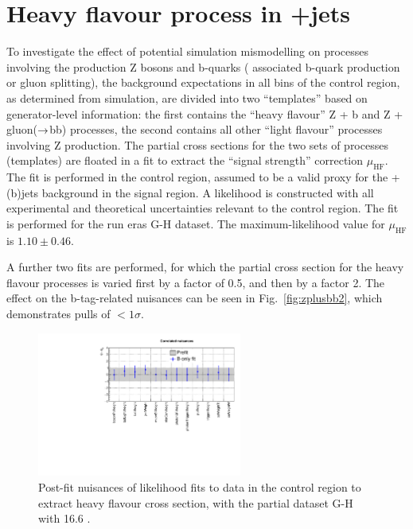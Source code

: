 
\section{Heavy flavour process in \texorpdfstring{\znunu}{Zinv}+jets}
\label{sec:zplusbb_app}

To investigate the effect of potential simulation mismodelling on
processes involving the production Z bosons and b-quarks (\ie
associated b-quark production or gluon splitting), the background
expectations in all bins of the \mmj control region, as determined
from simulation, are divided into two ``templates'' based on
generator-level information: the first contains the ``heavy flavour''
Z + b and Z + gluon($\rightarrow$bb) processes, the second contains
all other ``light flavour'' processes involving Z production. The
partial cross sections for the two sets of processes (templates) are
floated in a fit to extract the ``signal strength'' correction
$\mu_\mathrm{HF}$. The fit is performed in the \mmj control region,
assumed to be a valid proxy for the \znunu + (b)jets background in the
signal region. A likelihood is constructed with all experimental and 
theoretical uncertainties relevant to the \mmj control region. The fit
is performed for the run eras G-H dataset. The maximum-likelihood
value for $\mu_\mathrm{HF}$ is $1.10 \pm 0.46$.

A further two fits are performed, for which the partial cross section
for the heavy flavour processes is varied first by a factor of 0.5,
and then by a factor 2. The effect on the b-tag-related nuisances can
be seen in Fig.~\ref{fig:zplusbb2}, which demonstrates pulls of
$<1\sigma$.

\begin{figure}[h!]
  \centering
  \includegraphics[width=0.6\textwidth]{figures/ZPlusbb/TemplateFitv2_16invfb}
  \caption{Post-fit nuisances of likelihood fits to data in the \mmj
    control region to extract heavy flavour cross section, with the 
    partial dataset G-H with 16.6 \ifb. %
  }
  \label{fig:zplusbb}
\end{figure}

